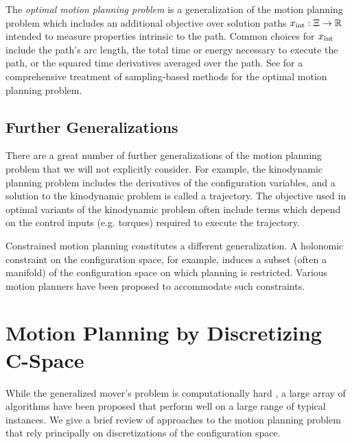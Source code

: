 The \emph{optimal motion planning problem}
is a generalization of the motion planning problem which
includes an additional objective over solution paths
$x_{\mbox{\scriptsize int}} : \Xi \rightarrow \mathbb{R}$
intended to measure properties intrinsic to the path.
Common choices for $x_{\mbox{\scriptsize int}}$ include
the path's arc length,
the total time or energy necessary to execute the path,
or the squared time derivatives averaged over the path.
See \citep{karaman2011samplingoptimal} for a comprehensive treatment
of sampling-based methods for the optimal motion planning problem.


\subsection{Further Generalizations}

There are a great number of further generalizations of the
motion planning problem that we will not explicitly consider.
For example,
the kinodynamic planning problem includes the derivatives of the
configuration variables,
and a solution to the kinodynamic problem is called a trajectory.
The objective used in optimal variants of the kinodynamic problem
often include terms which depend on the control inputs (e.g. torques)
required to execute the trajectory.

Constrained motion planning constitutes a different generalization.
A holonomic constraint on the configuration space,
for example,
induces a subset (often a manifold) of the configuration space
on which planning is restricted.
Various motion planners \citep{berenson2009manifolds}
have been proposed to accommodate such constraints.

\section{Motion Planning by Discretizing C-Space}

While the generalized mover's problem is computationally hard
\citep{reif1979moverscomplexity},
a large array of algorithms have been proposed that perform
well on a large range of typical instances.
We give a brief review of approaches to the motion planning problem
that rely principally on discretizations of the configuration space.

